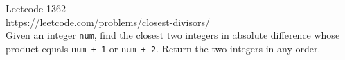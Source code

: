   Leetcode 1362 \\
  \url{https://leetcode.com/problems/closest-divisors/} \\
  Given an integer \verb!num!,
  find the closest two integers in absolute difference whose product equals
  \verb!num + 1! or \verb!num + 2!.
  Return the two integers in any order.
